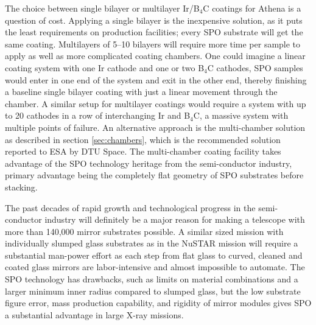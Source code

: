 The choice between single bilayer or multilayer Ir/B$_4$C coatings for Athena is a question of cost. Applying a single bilayer is the inexpensive solution, as it puts the least requirements on production facilities; every SPO substrate will get the same coating. Multilayers of 5--10 bilayers will require more time per sample to apply as well as more complicated coating chambers. One could imagine a linear coating system with one Ir cathode and one or two B$_4$C cathodes, SPO samples would enter in one end of the system and exit in the other end, thereby finishing a baseline single bilayer coating with just a linear movement through the chamber. A similar setup for multilayer coatings would require a system with up to 20 cathodes in a row of interchanging Ir and B$_4$C, a massive system with multiple points of failure. An alternative approach is the multi-chamber solution as described in section \ref{sec:chambers}, which is the recommended solution reported to ESA by DTU Space. The multi-chamber coating facility takes advantage of the SPO technology heritage from the semi-conductor industry, primary advantage being the completely flat geometry of SPO substrates before stacking.

The past decades of rapid growth and technological progress in the semi-conductor industry will definitely be a major reason for making a telescope with more than 140,000 mirror substrates possible. A similar sized mission with individually slumped glass substrates as in the NuSTAR mission will require a substantial man-power effort as each step from flat glass to curved, cleaned and coated glass mirrors are labor-intensive and almost impossible to automate. The SPO technology has drawbacks, such as limits on material combinations and a larger minimum inner radius compared to slumped glass, but the low substrate figure error, mass production capability, and rigidity of mirror modules gives SPO a substantial advantage in large X-ray missions.
